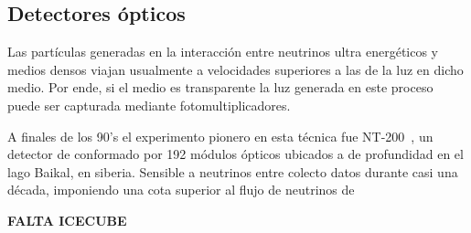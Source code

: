 	\subsection{Detectores \'opticos}
	Las part\'iculas generadas en la interacci\'on entre neutrinos ultra energ\'eticos y medios densos viajan usualmente a velocidades superiores a las de la luz en dicho medio.
	Por ende, si el medio es transparente la luz \cher{} generada en este proceso puede ser capturada mediante fotomultiplicadores.
	
	A finales de los 90's el experimento pionero en esta t\'ecnica fue NT-200~\cite{cite:nt200}, un detector de conformado por 192 m\'odulos \'opticos ubicados a  de profundidad en el lago Baikal, en siberia.
	Sensible a neutrinos entre  colecto datos durante casi una d\'ecada, imponiendo una cota superior al flujo de neutrinos de 
	
	\textbf{FALTA ICECUBE}
	
	
